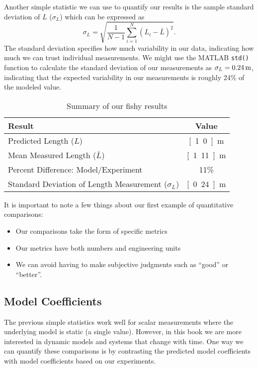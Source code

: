 Another simple statistic we can use to quantify our results is the \gls{sample standard deviation} of $L$ ($\sigma_L$) which can be expressed as
\begin{equation}\label{e:std}
\sigma_{L}=\sqrt{\frac{1}{N-1}\sum_{i=1}^{N}\left(L_i-\bar{L}\right)^2}.
\end{equation}
The standard deviation specifies how much variability in our data, indicating how much we can trust individual measurements.  We might use the MATLAB \texttt{std()} function to calculate the standard deviation of our measurements as $\sigma_L=\unit[0.24]{m}$, indicating that the expected variability in our measurements is roughly 24\% of the modeled value.  

\begin{table}[bt!] 
\renewcommand{\arraystretch}{1.2}
\caption{Summary of our fishy results}
\label{t:fishdata}
\centering
\begin{tabular}{|l|c|}\hline
Result & Value \\ \hline \hline
Predicted Length ($L$) & \unit[1.0]{m} \\ \hline
Mean Measured Length ($\bar{L}$) & \unit[1.11]{m} \\ \hline
Percent Difference: Model/Experiment & 11\% \\ \hline
Standard Deviation of Length Measurement ($\sigma_L$) & \unit[0.24]{m} \\ \hline
\end{tabular}
\end{table}

It is important to note a few things about our first example of quantitative comparisons:
\begin{itemize}
\item Our comparisons take the form of specific metrics
\item Our metrics have both numbers and engineering units
\item We can avoid having to make subjective judgments such as ``good'' or ``better''.
\end{itemize}

\subsection{Model Coefficients}
The previous simple statistics work well for scalar measurements where the underlying model is static (a single value).  However, in this book we are more interested in dynamic models and systems that change with time.  One way we can quantify these comparisons is by contrasting the predicted model coefficients with model coefficients based on our experiments.  

